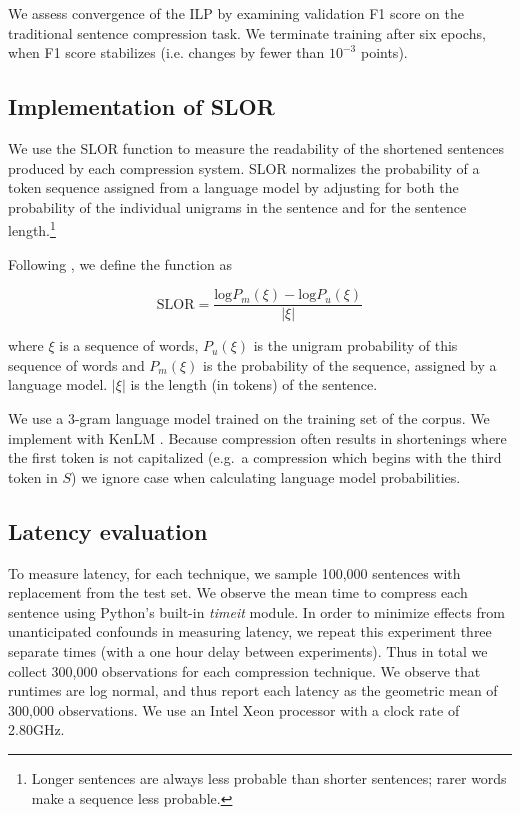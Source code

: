 We assess convergence of the ILP by examining validation F1 score on the traditional sentence compression task. We terminate training after six epochs, when F1 score stabilizes (i.e. changes by fewer than $10^{-3}$ points).

\subsection{Implementation of SLOR}

We use the SLOR function to measure the readability of the shortened sentences produced by each compression system. SLOR normalizes the probability of a token sequence assigned from a language model by adjusting for both the probability of the individual unigrams in the sentence and for the sentence length.\footnote{Longer sentences are always less probable than shorter sentences; rarer words make a sequence less probable.} 

Following \cite{lau2015unsupervised}, we define the function as 

\begin{equation}
\text{SLOR}=\frac{\text{log}P_m(\xi) - \text{log}P_u(\xi)}{|\xi|}
\end{equation}

where $\xi$ is a sequence of words, $P_u(\xi)$ is the unigram probability of this sequence of words and $P_m(\xi)$ is the probability of the sequence, assigned by a language model.  $|\xi|$ is the length (in tokens) of the sentence.

We use a 3-gram language model trained on the training set of the \citet{filippova2013overcoming} corpus. We implement with KenLM \cite{Heafield-kenlm}. Because compression often results in shortenings where the first token is not capitalized (e.g.\ a compression which begins with the third token in $S$) we ignore case when calculating language model probabilities.

\subsection{Latency evaluation}
To measure latency, for each technique, we sample 100,000 sentences with replacement from the test set. We observe the mean time to compress each sentence using Python's built-in \textit{timeit} module. In order to minimize effects from unanticipated confounds in measuring latency, we repeat this experiment three separate times (with a one hour delay between experiments). Thus in total we collect 300,000 observations for each compression technique. We observe that runtimes are log normal, and thus report each latency as the geometric mean of 300,000 observations. We use an Intel Xeon processor with a clock rate of 2.80GHz.

